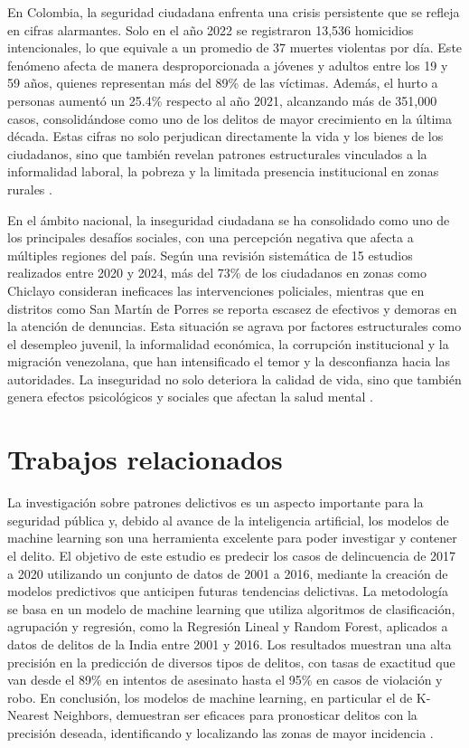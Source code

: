 \documentclass[runningheads]{llncs}
\begin{document}
En Colombia, la seguridad ciudadana enfrenta una crisis persistente que se
refleja en cifras alarmantes. Solo en el año 2022 se registraron 13,536
homicidios intencionales, lo que equivale a un promedio de 37 muertes violentas
por día. Este fenómeno afecta de manera desproporcionada a jóvenes y adultos
entre los 19 y 59 años, quienes representan más del 89\% de las víctimas. Además,
el hurto a personas aumentó un 25.4\% respecto al año 2021, alcanzando más de
351,000 casos, consolidándose como uno de los delitos de mayor crecimiento en la
última década. Estas cifras no solo perjudican directamente la vida
y los bienes de los ciudadanos, sino que también revelan patrones
estructurales vinculados a la informalidad laboral, la pobreza y la limitada
presencia institucional en zonas rurales \cite{nunez2024}.

En el ámbito nacional, la inseguridad ciudadana se ha consolidado como uno de
los principales desafíos sociales, con una percepción negativa que afecta a
múltiples regiones del país. Según una revisión sistemática de 15 estudios
realizados entre 2020 y 2024, más del 73\% de los ciudadanos en zonas como
Chiclayo consideran ineficaces las intervenciones policiales, mientras que en
distritos como San Martín de Porres se reporta escasez de efectivos y demoras en
la atención de denuncias. Esta situación se agrava por factores estructurales
como el desempleo juvenil, la informalidad económica, la corrupción
institucional y la migración venezolana, que han intensificado el temor y la
desconfianza hacia las autoridades. La inseguridad no solo deteriora la calidad
de vida, sino que también genera efectos psicológicos y sociales que afectan la
salud mental \cite{anton-chunga2025}.

\section{Trabajos relacionados}

La investigación sobre patrones delictivos es un aspecto importante para la
seguridad pública y, debido al avance de la inteligencia artificial, los modelos
de machine learning son una herramienta excelente para poder investigar y contener el
delito. El objetivo de este estudio es predecir los casos de delincuencia de
2017 a 2020 utilizando un conjunto de datos de 2001 a 2016, mediante la creación
de modelos predictivos que anticipen futuras tendencias delictivas. La
metodología se basa en un modelo de machine learning que utiliza algoritmos de
clasificación, agrupación y regresión, como la Regresión Lineal y Random Forest,
aplicados a datos de delitos de la India entre 2001 y 2016. Los resultados
muestran una alta precisión en la predicción de diversos tipos de delitos, con
tasas de exactitud que van desde el 89\% en intentos de asesinato hasta el 95\%
en casos de violación y robo. En conclusión, los modelos de machine learning, en
particular el de K-Nearest Neighbors, demuestran ser eficaces para pronosticar
delitos con la precisión deseada, identificando y localizando las zonas de mayor
incidencia \cite{s2024}.
\end{document}
